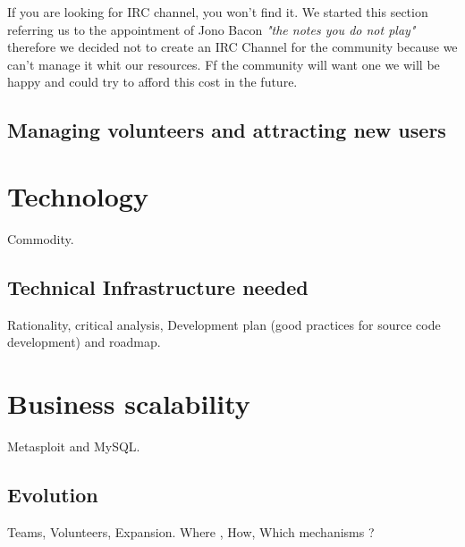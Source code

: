\documentclass[11pt]{scrartcl}
\begin{document}
\par If you are looking for IRC channel, you won't find it. We started this section referring us to the appointment of Jono Bacon \emph{"the notes you do not play"} therefore we decided not to create an IRC Channel for the community because we can't manage it whit our resources. Ff the community will want one we will be happy and could try to afford this cost in the future.


\subsection{Managing volunteers and attracting new users}
\label{sub:volunteers-users}


\section{Technology}
\label{sec:technology}

\par Commodity.


\subsection{Technical Infrastructure needed}
\label{sub:infrastructure}

\par Rationality, critical analysis, Development plan (good practices for source code development) and roadmap.


\section{Business scalability}
\label{sec:scalability}

\par Metasploit and MySQL.


\subsection{Evolution}
\label{sub:evolution}

\par Teams, Volunteers, Expansion. Where , How, Which mechanisms ?
\end{document}
